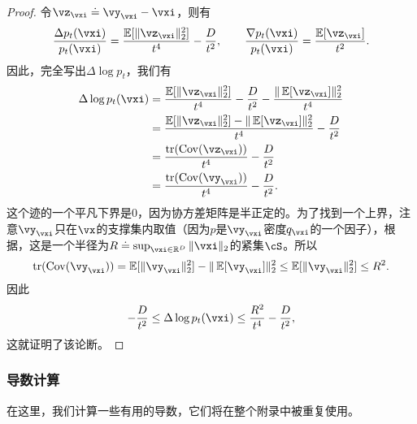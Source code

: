 \documentclass[../../book-main_zh.tex]{subfiles}
\begin{document}
\begin{proof}
    令\(\vz_{\vxi} \doteq \vy_{\vxi} - \vxi\)，则有
    \begin{equation}
        \frac{\Delta p_{t}(\vxi)}{p_{t}(\vxi)} = \frac{\Ex[\norm{\vz_{\vxi}}_{2}^{2}]}{t^{4}} - \frac{D}{t^{2}}, \qquad \frac{\nabla p_{t}(\vxi)}{p_{t}(\vxi)} = \frac{\Ex[\vz_{\vxi}]}{t^{2}}.
    \end{equation}
    因此，完全写出\(\Delta \log p_{t}\)，我们有
    \begin{align}
        \Delta \log p_{t}(\vxi)
        &= \frac{\Ex[\norm{\vz_{\vxi}}_{2}^{2}]}{t^{4}} - \frac{D}{t^{2}} - \frac{\norm{\Ex[\vz_{\vxi}]}_{2}^{2}}{t^{4}} \\
        &= \frac{\Ex[\norm{\vz_{\vxi}}_{2}^{2}] - \norm{\Ex[\vz_{\vxi}]}_{2}^{2}}{t^{4}} - \frac{D}{t^{2}} \\
        &= \frac{\tr(\Cov(\vz_{\vxi}))}{t^{4}} - \frac{D}{t^{2}} \\
        &= \frac{\tr(\Cov(\vy_{\vxi}))}{t^{4}} - \frac{D}{t^{2}}.
    \end{align}
    这个迹的一个平凡下界是\(0\)，因为协方差矩阵是半正定的。为了找到一个上界，注意\(\vy_{\vxi}\)只在\(\vx\)的支撑集内取值（因为\(p\)是\(\vy_{\vxi}\)密度\(q_{\vxi}\)的一个因子），根据，这是一个半径为\(R \doteq \sup_{\vxi \in \R^{D}}\norm{\vxi}_{2}\)的紧集\(\cS\)。所以
    \begin{equation}
        \tr(\Cov(\vy_{\vxi})) = \Ex[\norm{\vy_{\vxi}}_{2}^{2}] - \norm{\Ex[\vy_{\vxi}]}_{2}^{2} \leq \Ex[\norm{\vy_{\vxi}}_{2}^{2}] \leq R^{2}.
    \end{equation}
    因此
    \begin{equation}
        -\frac{D}{t^{2}} \leq \Delta \log p_{t}(\vxi) \leq \frac{R^{2}}{t^{4}} - \frac{D}{t^{2}},
    \end{equation}
    这就证明了该论断。
\end{proof}

\subsubsection{导数计算}

在这里，我们计算一些有用的导数，它们将在整个附录中被重复使用。
\end{document}
